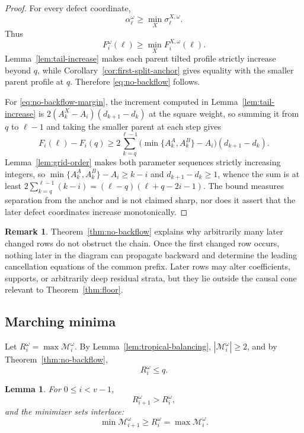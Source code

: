 \documentclass[11pt,a4paper]{amsart}
\numberwithin{equation}{section}
\theoremstyle{plain}
\newtheorem{lemma}[theorem]{Lemma}
\theoremstyle{definition}
\newtheorem{remark}[theorem]{Remark}
\begin{document}
\begin{proof}
For every defect coordinate,
\[
\alpha_\ell^\omega
\ge
\min_X\sigma_\ell^{X,\omega}.
\]
Thus
\[
F_i^\omega(\ell)
\ge
\min_X F_i^{X,\omega}(\ell).
\]
Lemma~\ref{lem:tail-increase} makes each parent tilted profile strictly increase beyond \(q\), while Corollary~\ref{cor:first-split-anchor} gives equality with the smaller parent profile at \(q\).  Therefore \eqref{eq:no-backflow} follows.

For \eqref{eq:no-backflow-margin}, the increment computed in Lemma~\ref{lem:tail-increase} is \(2(A_k^X-A_i)(d_{k+1}-d_k)\) at the square weight, so summing it from \(q\) to \(\ell-1\) and taking the smaller parent at each step gives
\[
F_i(\ell)-F_i(q)
\ge
2\sum_{k=q}^{\ell-1}\bigl(\min\{A_k^A,A_k^B\}-A_i\bigr)(d_{k+1}-d_k).
\]
Lemma~\ref{lem:grid-order} makes both parameter sequences strictly increasing integers, so \(\min\{A_k^A,A_k^B\}-A_i\ge k-i\) and \(d_{k+1}-d_k\ge1\), whence the sum is at least \(2\sum_{k=q}^{\ell-1}(k-i)=(\ell-q)(\ell+q-2i-1)\).  The bound measures separation from the anchor and is not claimed sharp, nor does it assert that the later defect coordinates increase monotonically.
\end{proof}

\begin{remark}
Theorem~\ref{thm:no-backflow} explains why arbitrarily many later changed rows do not obstruct the chain.  Once the first changed row occurs, nothing later in the diagram can propagate backward and determine the leading cancellation equations of the common prefix.  Later rows may alter coefficients, supports, or arbitrarily deep residual strata, but they lie outside the causal cone relevant to Theorem~\ref{thm:floor}.
\end{remark}

\subsection{Marching minima}\label{subsec:marching}

Let \(R_i^\omega=\max\mathcal M_i^\omega\).
By Lemma~\ref{lem:tropical-balancing}, \(|\mathcal M_i^\omega|\ge2\),
and by Theorem~\ref{thm:no-backflow},
\begin{equation}\label{eq:R-upper}
R_i^\omega\le q.
\end{equation}

\begin{lemma}\label{lem:marching}
For \(0\le i<v-1\),
\[
R_{i+1}^\omega>R_i^\omega,
\]
and the minimizer sets interlace:
\[
\min\mathcal M_{i+1}^\omega\ge R_i^\omega=\max\mathcal M_i^\omega.
\]
\end{lemma}
\end{document}
